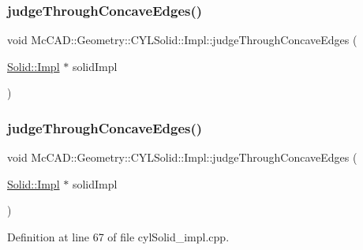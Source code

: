\subsubsection{\texorpdfstring{judge\+Through\+Concave\+Edges()}{judgeThroughConcaveEdges()}\hspace{0.1cm}{\footnotesize\ttfamily [1/2]}}
{\footnotesize\ttfamily void Mc\+C\+A\+D\+::\+Geometry\+::\+C\+Y\+L\+Solid\+::\+Impl\+::judge\+Through\+Concave\+Edges (\begin{DoxyParamCaption}\item[{\hyperlink{classMcCAD_1_1Geometry_1_1Solid_1_1Impl}{Solid\+::\+Impl} $\ast$}]{solid\+Impl }\end{DoxyParamCaption})}

\mbox{\label{classMcCAD_1_1Geometry_1_1CYLSolid_1_1Impl_a175966ac5e1a3e4f65b78dc22ee34677}} 
\subsubsection{\texorpdfstring{judge\+Through\+Concave\+Edges()}{judgeThroughConcaveEdges()}\hspace{0.1cm}{\footnotesize\ttfamily [2/2]}}
{\footnotesize\ttfamily void Mc\+C\+A\+D\+::\+Geometry\+::\+C\+Y\+L\+Solid\+::\+Impl\+::judge\+Through\+Concave\+Edges (\begin{DoxyParamCaption}\item[{\hyperlink{classMcCAD_1_1Geometry_1_1Solid_1_1Impl}{Solid\+::\+Impl} $\ast$}]{solid\+Impl }\end{DoxyParamCaption})}



Definition at line 67 of file cyl\+Solid\+\_\+impl.\+cpp.


